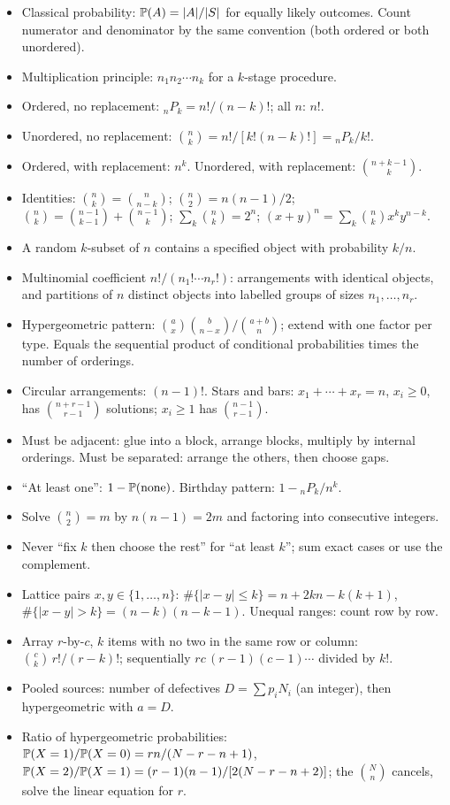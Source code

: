 \begin{itemize}[nosep]
\item Classical probability: $\mathbb{P}(A) = |A|/|S|$ for equally likely outcomes. Count numerator
and denominator by the same convention (both ordered or both unordered).
\item Multiplication principle: $n_1 n_2\cdots n_k$ for a $k$-stage procedure.
\item Ordered, no replacement: ${}_nP_k = n!/(n-k)!$; all $n$: $n!$.
\item Unordered, no replacement: $\binom{n}{k} = n!/[k!(n-k)!] = {}_nP_k/k!$.
\item Ordered, with replacement: $n^k$. Unordered, with replacement: $\binom{n+k-1}{k}$.
\item Identities: $\binom{n}{k}=\binom{n}{n-k}$; $\binom{n}{2}=n(n-1)/2$;
$\binom{n}{k}=\binom{n-1}{k-1}+\binom{n-1}{k}$; $\sum_k\binom{n}{k}=2^n$;
$(x+y)^n=\sum_k\binom{n}{k}x^ky^{n-k}$.
\item A random $k$-subset of $n$ contains a specified object with probability $k/n$.
\item Multinomial coefficient $n!/(n_1!\cdots n_r!)$: arrangements with identical objects, and
partitions of $n$ distinct objects into labelled groups of sizes $n_1,\dots,n_r$.
\item Hypergeometric pattern: $\binom{a}{x}\binom{b}{n-x}/\binom{a+b}{n}$; extend with one
factor per type. Equals the sequential product of conditional probabilities times the number
of orderings.
\item Circular arrangements: $(n-1)!$. Stars and bars: $x_1+\cdots+x_r=n$, $x_i\ge0$, has
$\binom{n+r-1}{r-1}$ solutions; $x_i\ge1$ has $\binom{n-1}{r-1}$.
\item Must be adjacent: glue into a block, arrange blocks, multiply by internal orderings.
Must be separated: arrange the others, then choose gaps.
\item ``At least one'': $1-\mathbb{P}(\text{none})$. Birthday pattern: $1-{}_nP_k/n^k$.
\item Solve $\binom{n}{2}=m$ by $n(n-1)=2m$ and factoring into consecutive integers.
\item Never ``fix $k$ then choose the rest'' for ``at least $k$''; sum exact cases or use
the complement.
\item Lattice pairs $x,y\in\{1,\dots,n\}$: $\#\{|x-y|\le k\} = n+2kn-k(k+1)$,
$\#\{|x-y|>k\} = (n-k)(n-k-1)$. Unequal ranges: count row by row.
\item Array $r$-by-$c$, $k$ items with no two in the same row or column:
$\binom{c}{k}\,r!/(r-k)!$; sequentially $rc\,(r-1)(c-1)\cdots$ divided by $k!$.
\item Pooled sources: number of defectives $D=\sum p_iN_i$ (an integer), then
hypergeometric with $a=D$.
\item Ratio of hypergeometric probabilities: $\mathbb{P}(X=1)/\mathbb{P}(X=0)=rn/(N-r-n+1)$,
$\mathbb{P}(X=2)/\mathbb{P}(X=1)=(r-1)(n-1)/[2(N-r-n+2)]$; the $\binom{N}{n}$ cancels, solve the
linear equation for $r$.
\end{itemize}
